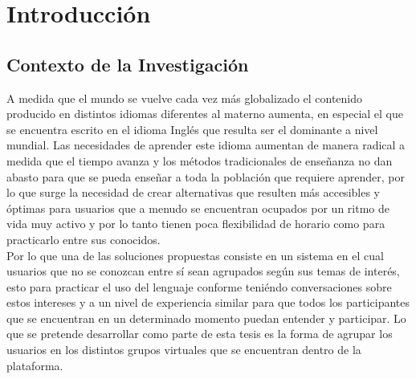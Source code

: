 \chapter{Introducción}
\label{chapter:chapter01}
\section{Contexto de la Investigación}
A medida que el mundo se vuelve cada vez más globalizado el contenido producido en distintos idiomas diferentes al materno aumenta, en especial el que se encuentra escrito en el idioma Inglés que resulta ser el dominante a nivel mundial. Las necesidades de aprender este idioma aumentan de manera radical a medida que el tiempo avanza y los métodos tradicionales de enseñanza no dan abasto para que se pueda enseñar a toda la población que requiere aprender, por lo que surge la necesidad de crear alternativas que resulten más accesibles y óptimas para usuarios que a menudo se encuentran ocupados por un ritmo de vida muy activo y por lo tanto tienen poca flexibilidad de horario como para practicarlo entre sus conocidos.\\ 

Por lo que una de las soluciones propuestas consiste en  un sistema en el cual usuarios que no se conozcan entre sí sean agrupados según sus temas de interés, esto para practicar el uso del lenguaje conforme teniéndo conversaciones sobre estos intereses y a un nivel de experiencia similar para que todos los participantes que se encuentran en un determinado momento puedan entender y participar. Lo que se pretende desarrollar como parte de esta tesis es la forma de agrupar  los usuarios en los distintos grupos virtuales que se encuentran dentro de la plataforma.\\ 


